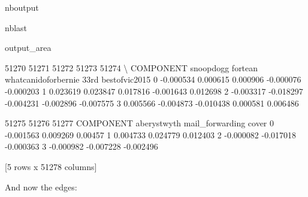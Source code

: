 \documentclass[letterpaper,10pt,english]{sphinxhowto}
\begin{document}
\begin{sphinxuseclass}{nboutput}
\begin{sphinxuseclass}{nblast}
{\begin{sphinxuseclass}{output_area}
\begin{sphinxuseclass}{}
\begin{sphinxVerbatim}[commandchars=\\\{\}]
               51270     51271                51272     51273          51274  \textbackslash{}
COMPONENT  snoopdogg   fortean  whatcanidoforbernie      33rd  bestofvic2015
0          -0.000534  0.000615             0.000906 -0.000076      -0.000203
1           0.023619  0.023847             0.017816 -0.001643       0.012698
2          -0.003317 -0.018297            -0.004231 -0.002896      -0.007575
3           0.005566 -0.004873            -0.010438  0.000581       0.006486

                 51275            51276     51277
COMPONENT  aberystwyth  mail\_forwarding     cover
0            -0.001563         0.009269   0.00457
1             0.004733         0.024779  0.012403
2            -0.000082        -0.017018 -0.000363
3            -0.000982        -0.007228 -0.002496

[5 rows x 51278 columns]
\end{sphinxVerbatim}



\end{sphinxuseclass}
\end{sphinxuseclass}
}

\end{sphinxuseclass}
\end{sphinxuseclass}
\sphinxAtStartPar
And now the edges:
\end{document}

